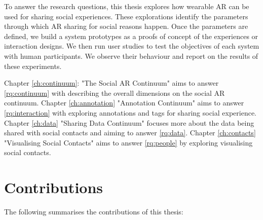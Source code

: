 To answer the research questions, this thesis explores how wearable AR can be used for sharing social experiences. These explorations identify the parameters through which AR sharing for social reasons happen. Once the parameters are defined, we build a system prototypes as a proofs of concept of the experiences or interaction designs. We then run user studies to test the objectives of each system with human participants. We observe their behaviour and report on the results of these experiments. 

Chapter \ref{ch:continuum}: "The Social AR Continuum" aims to answer \ref{rq:continuum} with describing the overall dimensions on the social AR continuum. Chapter \ref{ch:annotation} "Annotation Continuum" aims to answer \ref{rq:interaction} with exploring annotations and tags for sharing social experience. Chapter \ref{ch:data} "Sharing Data Continuum" focuses more about the data being shared with social contacts and aiming to answer \ref{rq:data}. Chapter \ref{ch:contacts} "Visualising Social Contacts" aims to answer \ref{rq:people} by exploring visualising social contacts. 

\section{Contributions}

The following summarises the contributions of this thesis: 


